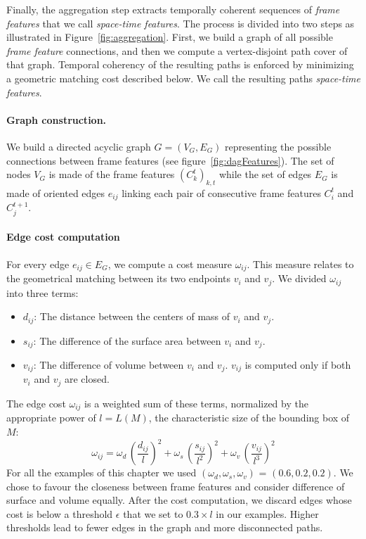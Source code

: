 Finally, the aggregation step extracts temporally coherent sequences of \emph{frame features} that we call \emph{space-time features}. 
The process is divided into two steps as illustrated in Figure~\ref{fig:aggregation}.
First, we build a graph of all possible \emph{frame feature} connections, and then we compute a vertex-disjoint path cover of that graph. Temporal coherency of the resulting paths is enforced by minimizing a geometric matching cost described below. We call the resulting paths \emph{space-time features}.

\paragraph*{Graph construction.}

We build a directed acyclic graph $G = (V_G, E_G) $ representing the possible connections between frame features (see figure~\ref{fig:dagFeatures}).
The set of nodes $V_{G}$ is made of the frame features $\left(C_{k}^{t}\right)_{k,t}$ while the set of edges $E_{G}$ is made of oriented edges $e_{ij}$ linking each pair of consecutive frame features $C_{i}^{t}$ and $C_{j}^{t+1}$.

\paragraph{Edge cost computation}

For every edge $e_{ij}\in E_{G}$, we compute a cost measure \(\omega_{ij}\). This measure relates to the geometrical matching between its two endpoints $v_{i}$ and $v_{j}$.
We divided \(\omega_{ij}\) into three terms:
\begin{itemize}
    \item $d_{ij}$: The distance between the centers of mass of $v_{i}$ and $v_{j}$.
    \item $s_{ij}$: The difference of the surface area between $v_{i}$ and $v_{j}$.
    \item $v_{ij}$: The difference of volume between $v_{i}$ and $v_{j}$. $v_{ij}$ is computed only if both $v_{i}$ and $v_{j}$ are closed.
\end{itemize}
The edge cost $\omega_{ij}$ is a weighted sum of these terms, normalized by the appropriate power of $l=L(M)$, the characteristic size of the bounding box of $M$:
\begin{equation}
\label{eq:costfunction}
\displaystyle \omega_{ij} = 
\omega_{d}\, \left(\frac{d_{ij}}{l  }\right)^2 +
\omega_{s}\, \left(\frac{s_{ij}}{l^2}\right)^2 + 
\omega_{v}\, \left(\frac{v_{ij}}{l^3}\right)^2
\end{equation}
For all the examples of this chapter we used $\left( \omega_{d}, \omega_{s}, \omega_{v} \right)$ = $\left(0.6,0.2,0.2\right)$. We chose to favour the closeness between frame features and consider difference of surface and volume equally. After the cost computation, we discard edges whose cost is below a threshold $\epsilon$ that we set to $0.3 \times l$ in our examples. Higher thresholds lead to fewer edges in the graph and more disconnected paths.

